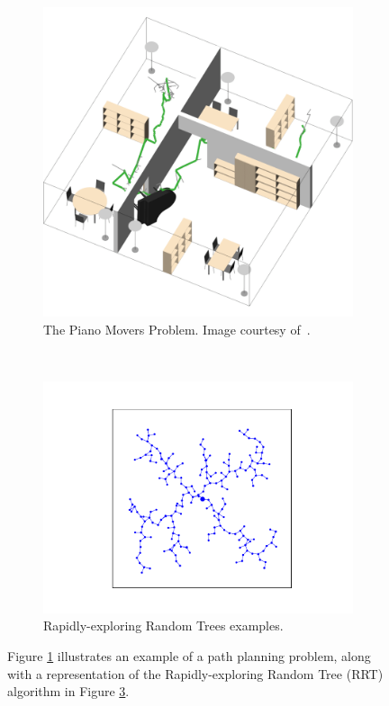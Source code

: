 \documentclass{ctuthesis}
\begin{document}
\begin{figure}
  \centering
  \begin{subfigure}[b]{0.4\textwidth}
      \includegraphics[width=\textwidth]{figChap1/The-piano-movers-problem-EET.png}
      \caption{The Piano Movers Problem. Image courtesy of~\cite{rickert2014piano}.}
      \label{fig:piano}
  \end{subfigure}
  ~ %
  \begin{subfigure}[b]{0.5\textwidth}
      \includegraphics[width=\textwidth]{figChap1/RRTsimple2.pdf}
      \caption{Rapidly-exploring Random Trees examples.}
      \label{fig:RRTsimple}
  \end{subfigure} 
  \caption{Figure \ref{fig:piano} illustrates an example of a path planning problem, 
  along with a representation of the Rapidly-exploring Random Tree (RRT) algorithm in Figure \ref{fig:RRTsimple}.}%
\end{figure}
\end{document}
